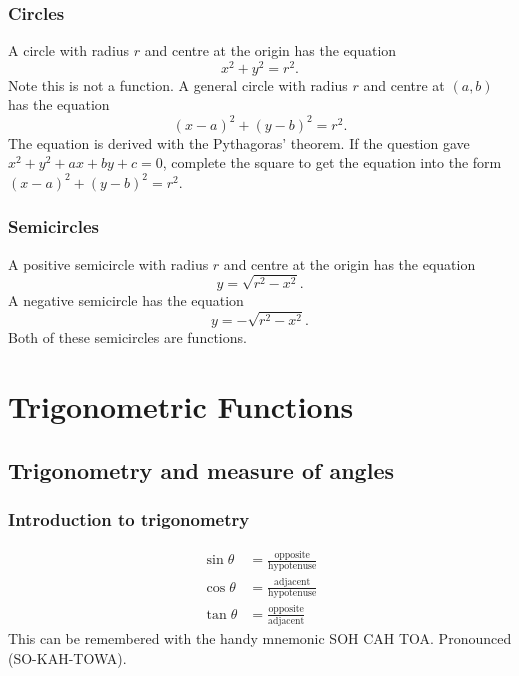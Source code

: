 \documentclass[12pt]{book}
\theoremstyle{definition}
\begin{document}
\subsection{Circles}
  A circle with radius $r$ and centre at the origin has the equation \[x^2+y^2=r^2.\] Note this is not a function.
  A general circle with radius $r$ and centre at $(a,b)$ has the equation \[(x-a)^2+(y-b)^2=r^2.\]
  The equation is derived with the Pythagoras' theorem. If the question gave $x^2+y^2+ax+by+c=0$, complete the square
  to get the equation into the form $(x-a)^2+(y-b)^2=r^2$.
\subsection{Semicircles}
  A positive semicircle with radius $r$ and centre at the origin has the equation \[y=\sqrt{r^2-x^2}.\] A negative semicircle
  has the equation \[y=-\sqrt{r^2-x^2}.\] Both of these semicircles are functions.


\chapter{Trigonometric Functions}
\section{Trigonometry and measure of angles}
\subsection{Introduction to trigonometry}
  \begin{align*}
    \sin\theta &=\frac{\text{opposite}}{\text{hypotenuse}}\\
    \cos\theta &= \frac{\text{adjacent}}{\text{hypotenuse}}\\
    \tan\theta &= \frac{\text{opposite}}{\text{adjacent}}
  \end{align*}
  This can be remembered with the handy mnemonic SOH CAH TOA. Pronounced (SO-KAH-TOWA).
\end{document}
